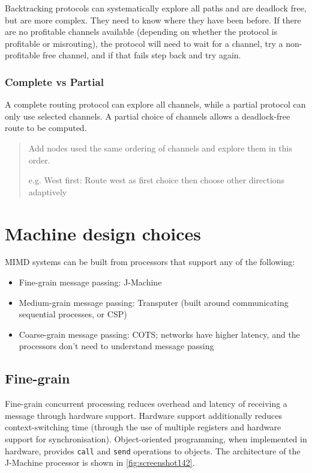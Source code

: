 Backtracking protocols can systematically explore all paths and are deadlock free, but are more complex. They need to know where they have been before. If there are no profitable channels available (depending on whether the protocol is profitable or misrouting), the protocol will need to wait for a channel, try a non-profitable free channel, and if that fails step back and try again.

\subsubsection{Complete vs Partial}
A complete routing protocol can explore all channels, while a partial protocol can only use selected channels. A partial choice of channels allows a deadlock-free route to be computed. 

\begin{quote}
Add nodes used the same ordering of channels and explore them in this order.

e.g. West first: Route west as first choice then choose other directions adaptively 
\end{quote}

\section{Machine design choices}
MIMD systems can be built from processors that support any of the following: \begin{itemize}
\item Fine-grain message passing: J-Machine
\item Medium-grain message passing: Transputer (built around communicating sequential processes, or CSP)
\item Coarse-grain message passing: COTS; networks have higher latency, and the processors don't need to understand message passing
\end{itemize}

\subsection{Fine-grain}
Fine-grain concurrent processing reduces overhead and latency of receiving a message through hardware support. Hardware support additionally reduces context-switching time (through the use of multiple registers and hardware support for synchronisation). Object-oriented programming, when implemented in hardware, provides \texttt{call} and \texttt{send} operations to objects. The architecture of the J-Machine processor is shown in \autoref{fig:screenshot142}.

